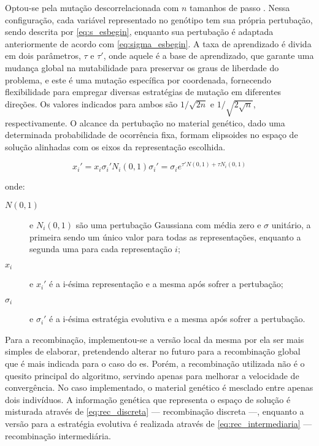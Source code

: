 Optou-se pela mutação descorrelacionada com $n$ tamanhos de passo
\cite[pp. 76--78]{eiben2003introduction}. Nessa configuração, cada
variável representado no genótipo tem sua própria pertubação, sendo
descrita por \ref{eq:s_esbegin}, enquanto sua pertubação é adaptada
anteriormente de acordo com \ref{eq:sigma_esbegin}. A taxa de
aprendizado é divida em dois parâmetros, $\tau$ e $\tau'$, onde aquele
é a base de aprendizado, que garante uma mudança global na
mutabilidade para preservar os graus de liberdade do problema, e este
é uma mutação específica por coordenada, fornecendo flexibilidade para
empregar diversas estratégias de mutação em diferentes direções. Os
valores indicados para ambos são $1/\sqrt{2n}$ e $1/\sqrt{2\sqrt{n}}$,
respectivamente. O alcance da pertubação no material genético, dado uma
determinada probabilidade de ocorrência fixa, formam elipsoides no
espaço de solução alinhadas com os eixos da representação escolhida. 

\begin{subequations}
\begin{equation}\label{eq:s_esbegin}
x_i' = x_i\sigma_i'N_i(0,1)
\end{equation}
\begin{equation}\label{eq:sigma_esbegin}
\sigma_i' = \sigma_ie^{\tau'N(0,1)+\tau N_i(0,1)}
\end{equation}
\end{subequations}

\noindent onde: 

\begin{description}
\item[$N(0,1)$] e $N_i(0,1)$ são uma pertubação Gaussiana com média
zero e $\sigma$ unitário, a primeira sendo um único valor para todas
as representações, enquanto a segunda uma para cada representação $i$; 
\item[$x_i$] e $x_i'$ é a i-ésima representação e a mesma após sofrer a
pertubação;
\item[$\sigma_i$] e $\sigma_i'$ é a i-ésima estratégia evolutiva e a
mesma após sofrer a pertubação.
\end{description}

Para a recombinação, implementou-se a versão local da mesma por ela
ser mais simples de elaborar, pretendendo alterar no futuro para
a recombinação global que é mais indicada para o caso do \acs{es}.
Porém, a recombinação utilizada não é o quesito principal do
algoritmo, servindo apenas para melhorar a velocidade de convergência.
No caso implementado, o material genético é mesclado entre apenas
dois indivíduos. A informação genética que representa o espaço de
solução é misturada através de \ref{eq:rec_discreta} --- recombinação discreta
---, enquanto a versão para a estratégia evolutiva é realizada através
de \ref{eq:rec_intermediaria} --- recombinação intermediária.

